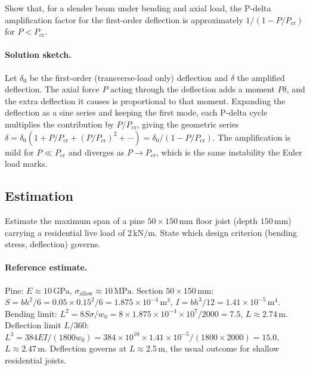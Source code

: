 \begin{exercise}
Show that, for a slender beam under bending and axial load, the
P-delta amplification factor for the first-order deflection is
approximately $1/(1 - P/P_{\text{cr}})$ for $P < P_{\text{cr}}$.

\paragraph{Solution sketch.} Let $\delta_0$ be the first-order
(transverse-load only) deflection and $\delta$ the amplified
deflection. The axial force $P$ acting through the deflection adds a
moment $P\delta$, and the extra deflection it causes is proportional to
that moment. Expanding the deflection as a sine series and keeping the
first mode, each P-delta cycle multiplies the contribution by
$P/P_{\text{cr}}$, giving the geometric series $\delta = \delta_0(1 +
P/P_{\text{cr}} + (P/P_{\text{cr}})^2 + \cdots) = \delta_0/(1 -
P/P_{\text{cr}})$. The amplification is mild for $P \ll P_{\text{cr}}$
and diverges as $P \to P_{\text{cr}}$, which is the same instability the
Euler load marks.
\end{exercise}

\subsection*{Estimation}

\begin{exercise}
Estimate the maximum span of a pine $50 \times 150\,\si{\milli\meter}$
floor joist (depth $150\,\si{\milli\meter}$) carrying a residential
live load of $2\,\text{kN}/\text{m}$. State which design criterion
(bending stress, deflection) governs.

\paragraph{Reference estimate.} Pine: $E \approx 10\,\text{GPa}$,
$\sigma_{\text{allow}} \approx 10\,\text{MPa}$. Section $50\times
150\,\si{\milli\meter}$: $S = bh^2/6 = 0.05\times 0.15^2/6 = 1.875
\times 10^{-4}\,\si{\meter\cubed}$, $I = bh^3/12 = 1.41\times 10^{-5}
\,\si{\meter\tothe{4}}$. Bending limit: $L^2 = 8S\sigma/w_0 = 8\times
1.875\times 10^{-4}\times 10^7/2000 = 7.5$, $L \approx 2.74\,\si{\meter}$.
Deflection limit $L/360$: $L^3 = 384EI/(1800 w_0) = 384\times 10^{10}
\times 1.41\times 10^{-5}/(1800\times 2000) = 15.0$, $L \approx 2.47\,
\si{\meter}$. Deflection governs at $L \approx 2.5\,\si{\meter}$, the
usual outcome for shallow residential joists.
\end{exercise}

